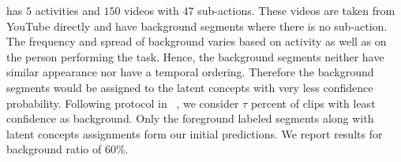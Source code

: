 \documentclass[final]{cvpr}
\begin{document}
 has $5$ activities and $150$ videos with $47$ sub-actions.
These videos are taken from YouTube directly and have background segments where there is no sub-action.  The frequency and spread of background varies based on activity as well as on the person performing the task. Hence, the background segments neither have similar appearance nor have a temporal ordering. Therefore the background segments would be assigned to the latent concepts with very less confidence probability. Following protocol in ~\cite{kukleva2019unsupervised}, we consider $\tau$ percent of clips with least confidence as background. Only the foreground labeled segments along with latent concepts assignments form our initial predictions. We report results for background ratio of 60\%. %
\end{document}
